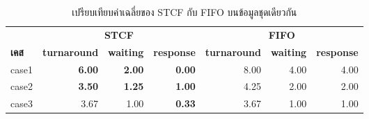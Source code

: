 \documentclass[a4paper,11pt]{article}
\begin{document}
\begin{table}[H]
\centering\small
\caption{เปรียบเทียบค่าเฉลี่ยของ STCF กับ FIFO บนข้อมูลชุดเดียวกัน}
\begin{tabular}{lrrrrrr}
\toprule
& \multicolumn{3}{c}{\textbf{STCF}} & \multicolumn{3}{c}{\textbf{FIFO}} \\
\cmidrule(lr){2-4}\cmidrule(lr){5-7}
\textbf{เคส} & \textbf{turnaround} & \textbf{waiting} & \textbf{response}
             & \textbf{turnaround} & \textbf{waiting} & \textbf{response} \\
\midrule
case1 & \textbf{6.00} & \textbf{2.00} & \textbf{0.00} & 8.00 & 4.00 & 4.00 \\
case2 & \textbf{3.50} & \textbf{1.25} & \textbf{1.00} & 4.25 & 2.00 & 2.00 \\
case3 & 3.67 & 1.00 & \textbf{0.33} & 3.67 & 1.00 & 1.00 \\
\bottomrule
\end{tabular}
\end{table}
\end{document}
